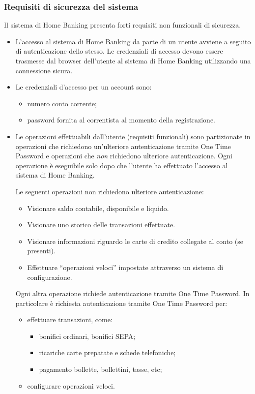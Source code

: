 \subsubsection{Requisiti di sicurezza del sistema}

Il sistema di Home Banking presenta forti requisiti non funzionali di sicurezza.

\begin{itemize}
	\item L'accesso al sistema di Home Banking da parte di un utente avviene a seguito di autenticazione dello stesso.
		Le credenziali di accesso devono essere trasmesse dal browser dell'utente al sistema di Home Banking utilizzando una connessione sicura.
	\item Le credenziali d'accesso per un account sono:
		\begin{itemize}
			\item numero conto corrente;
			\item password fornita al correntista al momento della registrazione.
		\end{itemize}
	\item Le operazioni effettuabili dall'utente (requisiti funzionali) sono partizionate in operazioni che richiedono un'ulteriore autenticazione tramite One Time Password e operazioni che \emph{non} richiedono ulteriore autenticazione.
	Ogni operazione \`e eseguibile solo dopo che l'utente ha effettuato l'accesso al sistema di Home Banking.

	Le seguenti operazioni non richiedono ulteriore autenticazione:
	\begin{itemize}
		\item Visionare saldo contabile, disponibile e liquido.
		\item Visionare uno storico delle transazioni effettuate.
		\item Visionare informazioni riguardo le carte di credito collegate al conto (se presenti).
		\item Effettuare ``operazioni veloci'' impostate attraverso un sistema di configurazione.
	\end{itemize}
	
	Ogni altra operazione richiede autenticazione tramite One Time Password.
	In particolare \`e richiesta autenticazione tramite One Time Password per:
	\begin{itemize}
		\item effettuare transazioni, come:
		\begin{itemize}
			\item bonifici ordinari, bonifici SEPA;
			\item ricariche carte prepatate e schede telefoniche;
			\item pagamento bollette, bollettini, tasse, etc;
		\end{itemize}
		\item configurare operazioni veloci.
	\end{itemize}
\end{itemize}

